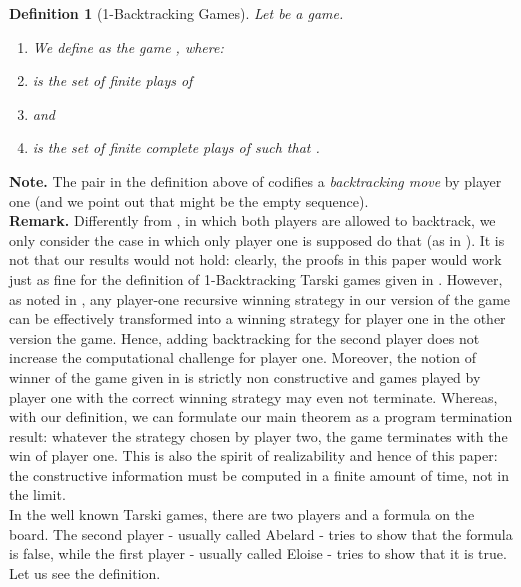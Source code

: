 \documentclass[copyright,creativecommons]{eptcs}
\newtheorem{definition}{Definition}
\begin{document}
\begin{definition}[1-Backtracking Games]
\label{definition-1BacktrackingGames} Let
 be a game.

\begin{enumerate}

\item
We define  as the game , where:\\
\item  is the set of finite plays of \\

\item   and  
\item  is  the set of finite complete plays  of
 such that .
\end{enumerate}
\end{definition}
\textbf{Note.} The pair  in the definition above of  codifies a {\em backtracking move} by player one (and we point out that  might be the empty sequence).\\
\textbf{Remark.} Differently from \cite{BerCoq}, in which both players are allowed to backtrack, we only consider the case in which only player one is supposed do that (as in \cite{Hayashi1}). It is not that our results would not hold: clearly, the proofs in this paper would work just as fine for the definition of 1-Backtracking Tarski games given in \cite{BerCoq}. However, as noted in \cite{BerCoq}, any player-one recursive winning strategy in our version of the game can be effectively transformed into a winning strategy for player one in the other version the game. Hence, adding backtracking for the second player does not increase the computational challenge for player one.
 Moreover, the notion of winner of the game given in \cite{BerCoq} is strictly non constructive and games played by player one with the correct winning strategy may even not terminate. Whereas, with our definition, we can formulate our main theorem as a program termination result: whatever the strategy chosen by player two, the game terminates with the win of player one. This is also the spirit of realizability and hence of this paper: the constructive information must be computed in a finite amount of time, not in the limit. \\
 
 
 
In the well known Tarski games, there are two players and a formula
on the board. The second player - usually called Abelard - tries to
show that the formula is false, while the first player - usually
called Eloise - tries to show that it is true. Let us see the
definition.
\end{document}
